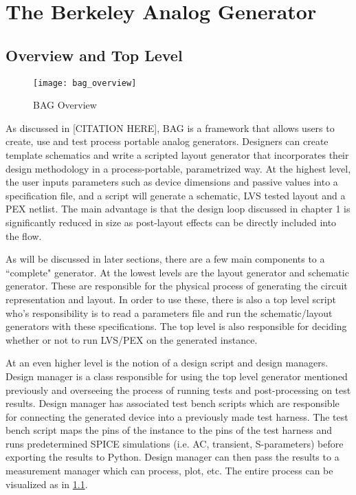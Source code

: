 \chapter{The Berkeley Analog Generator}

\section{Overview and Top Level}
\begin{figure}[h]
\centering
\texttt{[image: bag\_overview]}
\caption{BAG Overview}
\label{fig:bag_top_level}
\end{figure}
As discussed in [CITATION HERE], BAG is a framework that allows users to create, use and test process portable analog generators. Designers can create template schematics and write a scripted layout generator that incorporates their design methodology in a process-portable, parametrized way. At the highest level, the user inputs parameters such as device dimensions and passive values into a specification file, and a script will generate a schematic, LVS tested layout and a PEX netlist. The main advantage is that the design loop discussed in chapter 1 is significantly reduced in size as post-layout effects can be directly included into the flow. 

As will be discussed in later sections, there are a few main components to a ``complete" generator. At the lowest levels are the layout generator and schematic generator. These are responsible for the physical process of generating the circuit representation and layout. In order to use these, there is also a top level script who's responsibility is to read a parameters file and run the schematic/layout generators with these specifications. The top level is also responsible for deciding whether or not to run LVS/PEX on the generated instance.

At an even higher level is the notion of a design script and design managers. Design manager is a class responsible for using the top level generator mentioned previously and overseeing the process of running tests and post-processing on test results. Design manager has associated test bench scripts which are responsible for connecting the generated device into a previously made test harness. The test bench script maps the pins of the instance to the pins of the test harness and runs predetermined SPICE simulations (i.e. AC, transient, S-parameters) before exporting the results to Python. Design manager can then pass the results to a measurement manager which can process, plot, etc. The entire process can be visualized as in \ref{fig:bag_top_level}.

